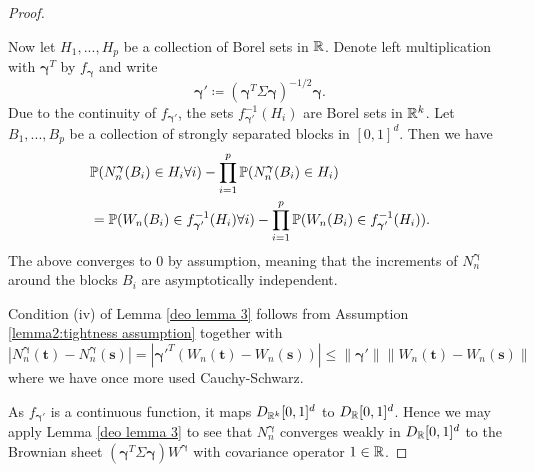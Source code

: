 \begin{proof}
\begin{aufzii}
        \item Now let $H_1, ..., H_p$ be a collection of Borel sets in $\mathbb{R}$. Denote left multiplication with ${\boldsymbol{\gamma}}^T$ by $f_{\boldsymbol{\gamma}}$ and write
        \[ {\boldsymbol{\gamma}}' \coloneqq \left({\boldsymbol{\gamma}}^T \Sigma {\boldsymbol{\gamma}} \right)^{-1/2} {\boldsymbol{\gamma}}. \]
        Due to the continuity of $f_{{\boldsymbol{\gamma}}'}$, the sets $f_{{\boldsymbol{\gamma}}'}^{-1}(H_i)$ are Borel sets in $\mathbb{R}^k$. Let $B_1, ..., B_p$ be a collection of strongly separated blocks in $[0, 1]^d$. Then we have
        \begin{align*}
            & \mathbb{P}(N_n^{\boldsymbol{\gamma}}(B_i) \in H_i \forall i) - \prod\limits_{i=1}^p \mathbb{P}(N_n^{\boldsymbol{\gamma}}(B_i) \in H_i) \\
            & = \mathbb{P}(W_n(B_i) \in f_{{\boldsymbol{\gamma}}'}^{-1}(H_i) \forall i) - \prod\limits_{i=1}^p \mathbb{P}(W_n(B_i) \in f_{{\boldsymbol{\gamma}}'}^{-1}(H_i)).
        \end{align*}
        The above converges to $0$ by assumption, meaning that the increments of $N_n^{\boldsymbol{\gamma}}$ around the blocks $B_i$ are asymptotically independent.
        \item Condition (iv) of Lemma \ref{deo lemma 3} follows from Assumption \eqref{lemma2:tightness assumption} together with
        \[ | N_n^{\boldsymbol{\gamma}}(\mathbf{t}) - N_n^{\boldsymbol{\gamma}}(\mathbf{s}) | = | {\boldsymbol{\gamma}}'^T (W_n(\mathbf{t}) - W_n(\mathbf{s})) | \leq \| {\boldsymbol{\gamma}}' \| \| W_n(\mathbf{t})-W_n(\mathbf{s})\| \]
        where we have once more used Cauchy-Schwarz.
    \end{aufzii}
    As $f_{{\boldsymbol{\gamma}}'}$ is a continuous function, it maps $D_{\mathbb{R}^k}[0,1]^d$ to $D_{\mathbb{R}}[0,1]^d$. Hence we may apply Lemma \ref{deo lemma 3} to see that $N_n^{\boldsymbol{\gamma}}$ converges weakly in $D_{\mathbb{R}}[0,1]^d$ to the Brownian sheet $({\boldsymbol{\gamma}}^T \Sigma {\boldsymbol{\gamma}}) W^{\boldsymbol{\gamma}}$ with covariance operator $1 \in \mathbb{R}$.


\end{proof}
